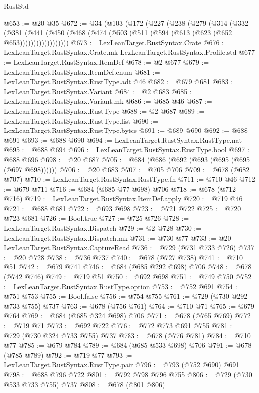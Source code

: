 \begin{lexlean}{RustStd}
\begin{coremodule}
@653 := @20 @35
@672 := @34
    (@103
      (@172
        (@227
          (@238
            (@279
              (@314
                (@332
                  (@381
                    (@441
                      (@450 (@468 (@474 (@503 (@511 (@594 (@613 (@623 (@652 @653))))))))))))))))))
@673 := LexLeanTarget.RustSyntax.Crate
@676 := LexLeanTarget.RustSyntax.Crate.mk LexLeanTarget.RustSyntax.Profile.std
@677 := LexLeanTarget.RustSyntax.ItemDef
@678 := @2 @677
@679 := LexLeanTarget.RustSyntax.ItemDef.enum
@681 := LexLeanTarget.RustSyntax.RustType.adt @46
@682 := @679 @681
@683 := LexLeanTarget.RustSyntax.Variant
@684 := @2 @683
@685 := LexLeanTarget.RustSyntax.Variant.mk
@686 := @685 @46
@687 := LexLeanTarget.RustSyntax.RustType
@688 := @2 @687
@689 := LexLeanTarget.RustSyntax.RustType.list
@690 := LexLeanTarget.RustSyntax.RustType.bytes
@691 := @689 @690
@692 := @688 @691
@693 := @688 @690
@694 := LexLeanTarget.RustSyntax.RustType.nat
@695 := @688 @694
@696 := LexLeanTarget.RustSyntax.RustType.bool
@697 := @688 @696
@698 := @20 @687
@705 := @684 (@686 (@692 (@693 (@695 (@695 (@697 @698))))))
@706 := @20 @683
@707 := @705 @706
@709 := @678 (@682 @707)
@710 := LexLeanTarget.RustSyntax.RustType.fn
@711 := @710 @46
@712 := @679 @711
@716 := @684 (@685 @77 @698) @706
@718 := @678 (@712 @716)
@719 := LexLeanTarget.RustSyntax.ItemDef.apply
@720 := @719 @46
@721 := @688 @681
@722 := @693 @698
@723 := @721 @722
@725 := @720 @723 @681
@726 := Bool.true
@727 := @725 @726
@728 := LexLeanTarget.RustSyntax.Dispatch
@729 := @2 @728
@730 := LexLeanTarget.RustSyntax.Dispatch.mk
@731 := @730 @77
@733 := @20 LexLeanTarget.RustSyntax.CaptureRead
@736 := @729 (@731 @733 @726)
@737 := @20 @728
@738 := @736 @737
@740 := @678 (@727 @738)
@741 := @710 @51
@742 := @679 @741
@746 := @684 (@685 @292 @698) @706
@748 := @678 (@742 @746)
@749 := @719 @51
@750 := @692 @698
@751 := @749 @750
@752 := LexLeanTarget.RustSyntax.RustType.option
@753 := @752 @691
@754 := @751 @753
@755 := Bool.false
@756 := @754 @755
@761 := @729 (@730 @292 @733 @755) @737
@763 := @678 (@756 @761)
@764 := @710 @71
@765 := @679 @764
@769 := @684 (@685 @324 @698) @706
@771 := @678 (@765 @769)
@772 := @719 @71
@773 := @692 @722
@776 := @772 @773 @691 @755
@781 := @729 (@730 @324 @733 @755) @737
@783 := @678 (@776 @781)
@784 := @710 @77
@785 := @679 @784
@789 := @684 (@685 @533 @698) @706
@791 := @678 (@785 @789)
@792 := @719 @77
@793 := LexLeanTarget.RustSyntax.RustType.pair
@796 := @793 (@752 @690) @691
@798 := @688 @796 @722
@801 := @792 @798 @796 @755
@806 := @729 (@730 @533 @733 @755) @737
@808 := @678 (@801 @806)

\end{coremodule}
\end{lexlean}
